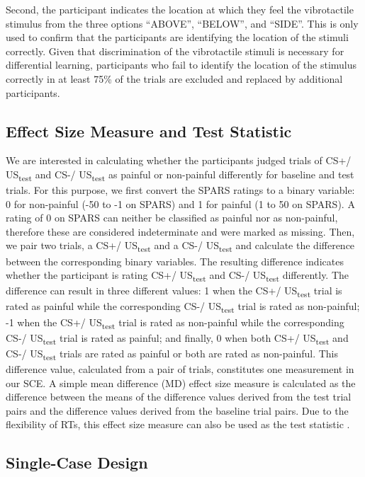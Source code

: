 \documentclass[empirical,issue, twocolumn,authordate]{jote-new-article}
\begin{document}
Second, the participant indicates the location at which they feel the vibrotactile stimulus from the three options “ABOVE”, “BELOW”, and “SIDE”. This is only used to confirm that the participants are identifying the location of the stimuli correctly. Given that discrimination of the vibrotactile stimuli is necessary for differential learning, participants who fail to identify the location of the stimulus correctly in at least 75\% of the trials are excluded and replaced by additional participants.

\subsection{Effect Size Measure and Test Statistic}

We are interested in calculating whether the participants judged trials of CS+/ US\textsubscript{test} and CS-/ US\textsubscript{test} as painful or non-painful differently for baseline and test trials. For this purpose, we first convert the SPARS ratings to a binary variable: 0 for non-painful (-50 to -1 on SPARS) and 1 for painful (1 to 50 on SPARS). A rating of 0 on SPARS can neither be classified as painful nor as non-painful, therefore these are considered indeterminate and were marked as missing. Then, we pair two trials, a CS+/ US\textsubscript{test} and a CS-/ US\textsubscript{test} and calculate the difference between the corresponding binary variables. The resulting difference indicates whether the participant is rating CS+/ US\textsubscript{test} and CS-/ US\textsubscript{test} differently. The difference can result in three different values: 1 when the CS+/ US\textsubscript{test} trial is rated as painful while the corresponding CS-/ US\textsubscript{test} trial is rated as non-painful; -1 when the CS+/ US\textsubscript{test} trial is rated as non-painful while the corresponding CS-/ US\textsubscript{test} trial is rated as painful; and finally, 0 when both CS+/ US\textsubscript{test} and CS-/ US\textsubscript{test} trials are rated as painful or both are rated as non-painful. This difference value, calculated from a pair of trials, constitutes one measurement in our SCE. A simple mean difference (MD) effect size measure is calculated as the difference between the means of the difference values derived from the test trial pairs and the difference values derived from the baseline trial pairs. Due to the flexibility of RTs, this effect size measure can also be used as the test statistic \parencite{Heyvaert2014a}. 

\subsection{Single-Case Design }
\end{document}
